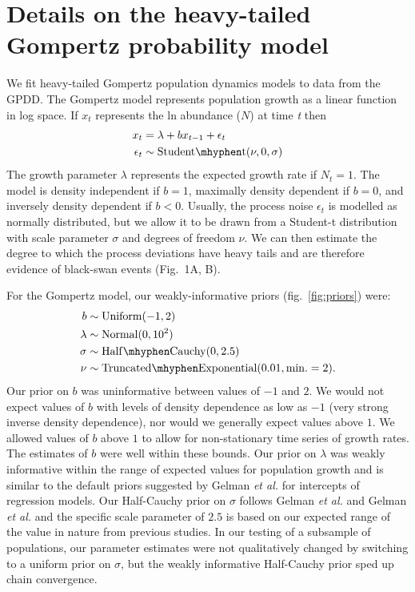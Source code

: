 \documentclass[12pt]{article}
\begin{document}
\section{Details on the heavy-tailed Gompertz probability model} We fit heavy-tailed Gompertz population dynamics models to data from the GPDD. The Gompertz model represents population growth as a linear function in log space. If \(x_{t}\) represents the ln abundance (\(N\)) at time \emph{t} then
\begin{align}
x_t &= \lambda + bx_{t - 1} + \epsilon_t\\
\epsilon_t &\sim \mathrm{Student\mhyphen t}(\nu, 0, \sigma)
\end{align}
The growth parameter \(\lambda\) represents the expected growth rate if \(N_{t} = 1\). The model is density independent if \(b = 1\), maximally density dependent if \(b = 0\), and inversely density dependent if \(b < 0\). Usually, the process noise \(\epsilon_{t}\) is modelled as normally distributed, but we allow it to be drawn from a Student-t distribution with scale parameter \(\sigma\) and degrees of freedom \(\nu\). We can then estimate the degree to which the process deviations have heavy tails and are therefore evidence of black-swan events (Fig.~1A, B).

For the Gompertz model, our weakly-informative priors (fig.~\ref{fig:priors}) were:
\begin{align}
b &\sim \mathrm{Uniform}(-1, 2)\\ \lambda &\sim \mathrm{Normal}(0, 10^2)\\
\sigma &\sim \mathrm{Half\mhyphen Cauchy} (0, 2.5)\\ \nu &\sim
\mathrm{Truncated\mhyphen Exponential}(0.01, \mathrm{min.} = 2).
\end{align}
Our prior on \(b\) was uninformative between values of \(-1\) and \(2\). We would not expect values of \(b\) with levels of density dependence as low as \(-1\) (very strong inverse density dependence), nor would we generally expect values above \(1\). We allowed values of \(b\) above \(1\) to allow for non-stationary time series of growth rates. The estimates of \(b\) were well within these bounds. Our prior on \(\lambda\) was weakly informative within the range of expected values for population growth and is similar to the default priors suggested by Gelman \emph{et al.}\cite{gelman2008d} for intercepts of regression models. Our Half-Cauchy prior on \(\sigma\) follows Gelman \emph{et al.}\cite{gelman2006c} and Gelman \emph{et al.}\cite{gelman2008d} and the specific scale parameter of \(2.5\) is based on our expected range of the value in nature from previous studies\cite{connors2014}. In our testing of a subsample of populations, our parameter estimates were not qualitatively changed by switching to a uniform prior on \(\sigma\), but the weakly informative Half-Cauchy prior sped up chain convergence.
\end{document}
